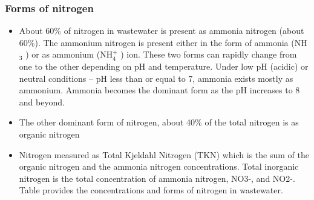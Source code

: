 	\subsubsection{Forms of nitrogen}	
					      \begin{itemize}
					      	\item About 60\% of nitrogen in wastewater is present as ammonia nitrogen (about 60\%).  The ammonium nitrogen is present either in the form of ammonia (NH$_3$ ) or as ammonium (NH$_4^+$ ) ion.   These two forms can rapidly change from one to the other depending on pH and temperature.  Under low pH (acidic) or neutral conditions – pH less than or equal to 7, ammonia exists mostly as ammonium.  Ammonia becomes the dominant form as the pH increases to 8 and beyond.
					      	\item The other dominant form of nitrogen, about 40\% of the total nitrogen is as organic nitrogen
					      	\item Nitrogen measured as Total Kjeldahl Nitrogen (TKN) which is the sum of the organic nitrogen and the ammonia nitrogen concentrations.  Total inorganic nitrogen is the total concentration of ammonia nitrogen, NO3-, and NO2-.   Table provides the concentrations and forms of nitrogen in wastewater.
					      \end{itemize}
					      \setlength{\arrayrulewidth}{0.7mm}
					      \setlength{\tabcolsep}{8 pt}
					      \renewcommand{\arraystretch}{0.8}
